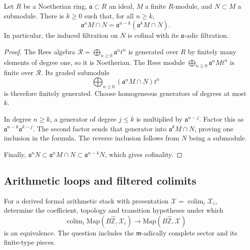 \begin{lemma}
\label{v4-arith:w5-i:lem:artin-rees}
Let \(R\) be a Noetherian ring, \(\mathfrak a\subset R\) an ideal,
\(M\) a finite \(R\)-module, and \(N\subset M\) a submodule.
There is \(k\ge0\) such that, for all \(n\ge k\),
\begin{equation}
\label{v4-arith:w5-i:eq:artin-rees}
 \mathfrak a^nM\cap N
       =\mathfrak a^{n-k}(\mathfrak a^kM\cap N).
\end{equation}
In particular, the induced filtration on \(N\) is cofinal with
its \(\mathfrak a\)-adic filtration.
\end{lemma}
\begin{proof}
The Rees algebra \(\mathcal R=\bigoplus_{n\ge0}\mathfrak a^nt^n\)
is generated over \(R\) by finitely many elements of degree one,
so it is Noetherian. The Rees module
\(\bigoplus_{n\ge0}\mathfrak a^nMt^n\) is finite over \(\mathcal R\).
Its graded submodule
\[
 \bigoplus_{n\ge0}(\mathfrak a^nM\cap N)t^n
\]
is therefore finitely generated. Choose homogeneous generators of
degrees at most \(k\).

In degree \(n\ge k\), a generator of degree
\(j\le k\) is multiplied by \(\mathfrak a^{n-j}\).
Factor this as \(\mathfrak a^{n-k}\mathfrak a^{k-j}\).
The second factor sends that generator into
\(\mathfrak a^kM\cap N\), proving one inclusion in the formula.
The reverse inclusion follows from \(N\) being a submodule.

Finally,
\(\mathfrak a^nN\subset\mathfrak a^nM\cap N
\subset\mathfrak a^{n-k}N\), which gives cofinality.
\end{proof}

\subsection{Arithmetic loops and filtered colimits}
\label{v4-arith:w5-i:R1-formal-b-closure}

\begin{question}
\label{v4-arith:w5-i:prop:b2-closure}
For a derived formal arithmetic stack with presentation
\(\mathcal X=\operatorname{colim}_i\mathcal X_i\), determine the
coefficient, topology and transition hypotheses under which
\[
 \operatorname{colim}_i
       \mathrm{Map}(B\widehat{\mathbb Z},\mathcal X_i)
 \longrightarrow
       \mathrm{Map}(B\widehat{\mathbb Z},\mathcal X)
\]
is an equivalence. The question includes the
\(\mathfrak m\)-adically complete sector and its finite-type pieces.
\end{question}

